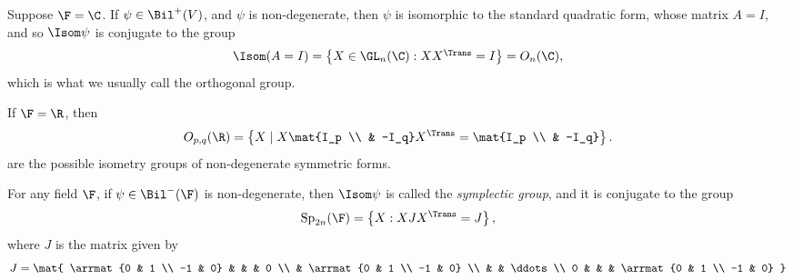\begin{example}
	Suppose $\F=\C$. If $\psi\in\Bil^+(V)$, and $\psi$ is non-degenerate, then $\psi$ is isomorphic to the standard quadratic form, whose matrix  $A=I$, and so $\Isom\psi$ is conjugate to the group %
	\begin{equation*}
		\Isom(A=I) = \left\{X\in\textstyle\GL_n(\C) : XX^\Trans = I\right\} = O_n(\C),
	\end{equation*}
	which is what we usually call the orthogonal group.
	
	If $\F=\R$, then
	\begin{equation*}
		O_{p,q}(\R)=\left\{X \mid X\mat{I_p \\ & -I_q} X^\Trans = \mat{I_p \\ & -I_q}\right\}.
	\end{equation*}
	are the possible isometry groups of non-degenerate symmetric forms. %
	
		\pagebreak
	
	For any field $\F$, if $\psi\in\Bil^-(\F)$ is non-degenerate, then $\Isom\psi$ is called the \emph{symplectic group}, and it is conjugate to the group %
	\begin{equation*}
		\text{Sp}_{2n}(\F) = \left\{X: XJX^\Trans = J\right\},
	\end{equation*}
	where $J$ is the matrix given by
	\begin{equation*}
		J =
		\mat{
			\arrmat{0 & 1 \\ -1 & 0} & & & 0 \\
			& \arrmat{0 & 1 \\ -1 & 0} \\
			& & \ddots \\
			0 & & & \arrmat{0 & 1 \\ -1 & 0}
		}
	\end{equation*}
\end{example}

